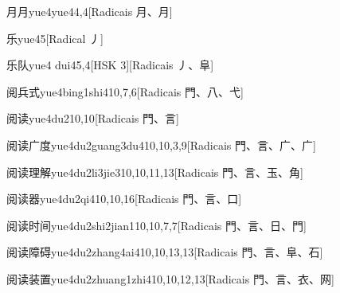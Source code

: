\begin{entry}{月月}{yue4yue4}{4,4}[Radicais ⽉、⽉]
\end{entry}

\begin{entry}{乐}{yue4}{5}[Radical ⼃]
\end{entry}

\begin{entry}{乐队}{yue4 dui4}{5,4}[HSK 3][Radicais ⼃、⾩]
\end{entry}

\begin{entry}{阅兵式}{yue4bing1shi4}{10,7,6}[Radicais ⾨、⼋、⼷]
\end{entry}

\begin{entry}{阅读}{yue4du2}{10,10}[Radicais ⾨、⾔]
\end{entry}

\begin{entry}{阅读广度}{yue4du2guang3du4}{10,10,3,9}[Radicais ⾨、⾔、⼴、⼴]
\end{entry}

\begin{entry}{阅读理解}{yue4du2li3jie3}{10,10,11,13}[Radicais ⾨、⾔、⽟、⾓]
\end{entry}

\begin{entry}{阅读器}{yue4du2qi4}{10,10,16}[Radicais ⾨、⾔、⼝]
\end{entry}

\begin{entry}{阅读时间}{yue4du2shi2jian1}{10,10,7,7}[Radicais ⾨、⾔、⽇、⾨]
\end{entry}

\begin{entry}{阅读障碍}{yue4du2zhang4ai4}{10,10,13,13}[Radicais ⾨、⾔、⾩、⽯]
\end{entry}

\begin{entry}{阅读装置}{yue4du2zhuang1zhi4}{10,10,12,13}[Radicais ⾨、⾔、⾐、⽹]
\end{entry}

